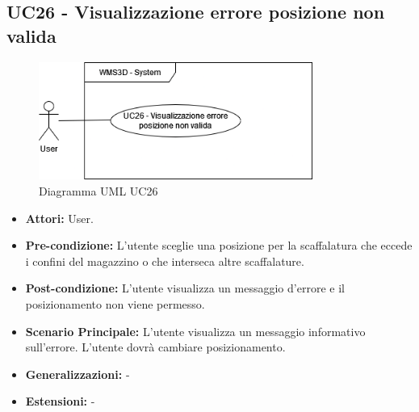 \subsection{UC26 - Visualizzazione errore posizione non valida}
\begin{figure}[H]
  \centering
  \includegraphics[width=0.8\textwidth]{UC_diagrams_21-26/UC26.drawio.png}
   \caption{Diagramma UML UC26}
\end{figure}
\begin{itemize}
    \item \textbf{Attori:} User.
    \item \textbf{Pre-condizione:}  L'utente sceglie una posizione per la scaffalatura che eccede i confini del magazzino o che interseca altre scaffalature.
    \item \textbf{Post-condizione:} L'utente visualizza un messaggio d'errore e il posizionamento non viene permesso.
    \item \textbf{Scenario Principale:} L'utente visualizza un messaggio informativo sull'errore. L'utente dovrà cambiare posizionamento.
    \item \textbf{Generalizzazioni:} -
    \item \textbf{Estensioni:} -
\end{itemize}